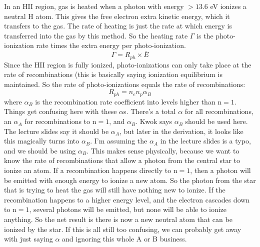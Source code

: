 In an HII region, gas is heated when a photon with energy $>13.6$ eV ionizes 
a neutral H atom.  This gives the free electron extra kinetic energy, which 
it transfers to the gas.  The rate of heating is just the rate at which 
energy is transferred into the gas by this method.  So the heating rate 
$\Gamma$ is the photo-ionization rate times the extra energy per 
photo-ionization.
\begin{equation}
\Gamma=R_{ph}\times\bar{E}
\end{equation}
Since the HII region is fully ionized, photo-ionizations can only take 
place at the rate of recombinations (this is basically saying ionization 
equilibrium is maintained.  So the rate of photo-ionizations equals the rate 
of recombinations:
\begin{equation}
R_{ph}=n_en_p\alpha_B
\end{equation}
where $\alpha_B$ is the recombination rate coefficient into levels higher than 
n$=1$.  Things get confusing here with these $\alpha$s.  There's a total $\alpha$ 
for all recombinations, an $\alpha_A$ for recombinations to n$=1$, and 
$\alpha_B$.  Kwok says $\alpha_B$ should be used here.  The lecture slides 
say it should be $\alpha_A$, but later in the derivation, it looks like this 
magically turns into $\alpha_B$.  I'm assuming the $\alpha_A$ in the lecture 
slides is a typo, and we should be using $\alpha_B$.  This makes sense 
physically, because we want to know the rate of recombinations that allow 
a photon from the central star to ionize an atom.  If a recombination happens 
directly to n$=1$, then a photon will be emitted with enough energy to 
ionize a new atom.  So the photon from the star that is trying to heat the gas 
will still have nothing new to ionize.  If the recombination happens to a 
higher energy level, and the electron cascades down to n$=1$, several photons 
will be emitted, but none will be able to ionize anything.  So the net result 
is there is now a new neutral atom that can be ionized by the star.  If this 
is all still too confusing, we can probably get away with just saying $\alpha$ 
and ignoring this whole A or B business. 

